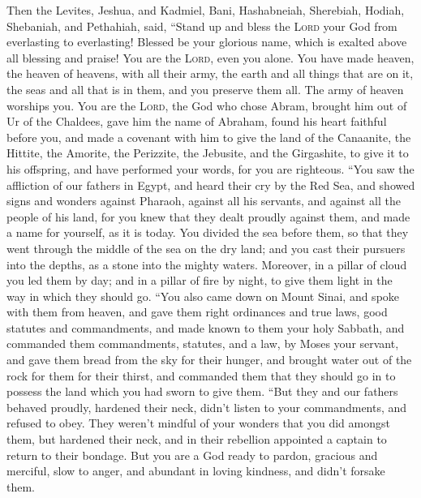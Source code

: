  Then the Levites, Jeshua, and Kadmiel, Bani, Hashabneiah,
Sherebiah, Hodiah, Shebaniah, and Pethahiah, said, ``Stand up and bless
the \textsc{Lord} your God from everlasting to everlasting! Blessed be
your glorious name, which is exalted above all blessing and praise!
 You are the \textsc{Lord}, even you alone. You have made
heaven, the heaven of heavens, with all their army, the earth and all
things that are on it, the seas and all that is in them, and you
preserve them all. The army of heaven worships you.  You
are the \textsc{Lord}, the God who chose Abram, brought him out of Ur of
the Chaldees, gave him the name of Abraham,  found his
heart faithful before you, and made a covenant with him to give the land
of the Canaanite, the Hittite, the Amorite, the Perizzite, the Jebusite,
and the Girgashite, to give it to his offspring, and have performed your
words, for you are righteous.  ``You saw the affliction of
our fathers in Egypt, and heard their cry by the Red Sea,
 and showed signs and wonders against Pharaoh, against
all his servants, and against all the people of his land, for you knew
that they dealt proudly against them, and made a name for yourself, as
it is today.  You divided the sea before them, so that
they went through the middle of the sea on the dry land; and you cast
their pursuers into the depths, as a stone into the mighty waters.
 Moreover, in a pillar of cloud you led them by day; and
in a pillar of fire by night, to give them light in the way in which
they should go.  ``You also came down on Mount Sinai, and
spoke with them from heaven, and gave them right ordinances and true
laws, good statutes and commandments,  and made known to
them your holy Sabbath, and commanded them commandments, statutes, and a
law, by Moses your servant,  and gave them bread from the
sky for their hunger, and brought water out of the rock for them for
their thirst, and commanded them that they should go in to possess the
land which you had sworn to give them.  ``But they and
our fathers behaved proudly, hardened their neck, didn't listen to your
commandments,  and refused to obey. They weren't mindful
of your wonders that you did amongst them, but hardened their neck, and
in their rebellion appointed a captain to return to their bondage. But
you are a God ready to pardon, gracious and merciful, slow to anger, and
abundant in loving kindness, and didn't forsake them. 
